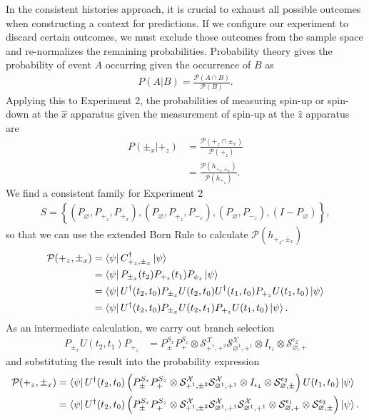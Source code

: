 In the consistent histories approach, it is crucial to exhaust all possible outcomes when constructing a context for predictions. If we configure our experiment to discard certain outcomes, we must exclude those outcomes from the sample space and re-normalizes the remaining probabilities. Probability theory gives the probability of event $A$ occurring given the occurrence of $B$ as
\begin{align}
  P(A|B) = \frac{\mathcal{P}(A\cap B)}{\mathcal{P}(B)}.
\end{align}
Applying this to Experiment 2, the probabilities of measuring spin-up or spin-down at the $\hat{x}$ apparatus given the measurement of spin-up at the $\hat{z}$ apparatus are
\begin{align} \label{eq: conditional consecutive probability}
  P(\pm_x|+_z) &= \frac{{\mathcal{P}(+_z\cap \pm_x)}}{{\mathcal{P}(+_z)}} \\ \nonumber
  &= \frac{\mathcal{P}(h_{+_z, \pm_x})}{\mathcal{P}(h_{+_z})}.
\end{align}
We find a consistent family for Experiment 2
\begin{align}
  S = \left\{\left(P_\varnothing, P_{+_z}, P_{+_x} \right), \left(P_\varnothing, P_{+_z}, P_{-_x} \right), \left(P_\varnothing, P_{-_z} \right), \left(I - P_\varnothing \right) \right\},
\end{align}
so that we can use the extended Born Rule to calculate $\mathcal{P}(h_{+_z, \pm_x})$
\begin{align}
  \mathcal{P}(+_z, \pm_x) &= \bra{\psi} C^\dagger_{+_z, \pm_x} \ket{\psi} \\ \nonumber
  &= \bra{\psi} P_{\pm_x}(t_2) P_{+_z}(t_1) P_{\psi_s} \ket{\psi} \\ \nonumber
  &= \bra{\psi} U^\dagger(t_2, t_0) P_{\pm_x} U(t_2, t_0) U^\dagger(t_1, t_0) P_{+_z} U(t_1, t_0)  \ket{\psi} \\ \nonumber
  &= \bra{\psi} U^\dagger(t_2, t_0) P_{\pm_x} U(t_2, t_1) P_{+_z} U(t_1, t_0) \ket{\psi}.
\end{align}
As an intermediate calculation, we carry out branch selection
\begin{align}
   P_{\pm_x} U(t_2, t_1) P_{+_z} &= P^{S_x}_\pm P^{S_z}_+ \otimes \mathcal{S}^\mathcal{X}_{+^1, +^2} \mathcal{S}^\mathcal{X}_{\varnothing^1, +^1} \otimes I_{\epsilon_1} \otimes \mathcal{S}^{\epsilon_2}_{\varnothing, +}
\end{align}
and substituting the result into the probability expression
\begin{align}
  \mathcal{P}(+_z, \pm_x) &= \bra{\psi} U^\dagger(t_2, t_0) \left(P^{S_x}_\pm P^{S_z}_+ \otimes \mathcal{S}^\mathcal{X}_{+^1, \pm^2} \mathcal{S}^\mathcal{X}_{\varnothing^1, +^1} \otimes I_{\epsilon_1} \otimes \mathcal{S}^{\epsilon_2}_{\varnothing, \pm} \right) U(t_1, t_0) \ket{\psi} \\ \nonumber
  &= \bra{\psi}  U^\dagger(t_2, t_0) \left(P^{S_x}_\pm P^{S_z}_+ \otimes \mathcal{S}^\mathcal{X}_{+^1, \pm^2} \mathcal{S}^\mathcal{X}_{ \varnothing^1, +^1}  \mathcal{S}^{\mathcal{X}}_{\varnothing^1, +^1} \otimes \mathcal{S}^{\epsilon_1}_{\varnothing, +} \otimes \mathcal{S}^{\epsilon_2}_{\varnothing, \pm} \right) \ket{\psi}.
\end{align}

